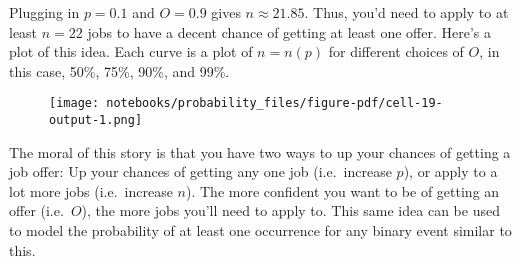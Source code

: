 \documentclass[
  letterpaper,
  DIV=11,
  numbers=noendperiod]{scrreprt}
\newenvironment{Shaded}{\begin{snugshade}}{\end{snugshade}}
\newcommand{\BuiltInTok}[1]{\textcolor[rgb]{0.00,0.23,0.31}{#1}}
\newcommand{\ControlFlowTok}[1]{\textcolor[rgb]{0.00,0.23,0.31}{#1}}
\newcommand{\DecValTok}[1]{\textcolor[rgb]{0.68,0.00,0.00}{#1}}
\newcommand{\FloatTok}[1]{\textcolor[rgb]{0.68,0.00,0.00}{#1}}
\newcommand{\KeywordTok}[1]{\textcolor[rgb]{0.00,0.23,0.31}{#1}}
\newcommand{\NormalTok}[1]{\textcolor[rgb]{0.00,0.23,0.31}{#1}}
\newcommand{\OperatorTok}[1]{\textcolor[rgb]{0.37,0.37,0.37}{#1}}
\newcommand{\SpecialCharTok}[1]{\textcolor[rgb]{0.37,0.37,0.37}{#1}}
\newcommand{\SpecialStringTok}[1]{\textcolor[rgb]{0.13,0.47,0.30}{#1}}
\newcommand{\StringTok}[1]{\textcolor[rgb]{0.13,0.47,0.30}{#1}}
\newcommand{\VariableTok}[1]{\textcolor[rgb]{0.07,0.07,0.07}{#1}}
\begin{document}
Plugging in \(p=0.1\) and \(O=0.9\) gives \(n \approx 21.85\). Thus,
you'd need to apply to at least \(n=22\) jobs to have a decent chance of
getting at least one offer. Here's a plot of this idea. Each curve is a
plot of \(n=n(p)\) for different choices of \(O\), in this case, 50\%,
75\%, 90\%, and 99\%.

\begin{Shaded}
\end{Shaded}

\begin{figure}[H]

{\centering \texttt{[image: notebooks/probability\_files/figure-pdf/cell-19-output-1.png]}

}

\end{figure}

The moral of this story is that you have two ways to up your chances of
getting a job offer: Up your chances of getting any one job
(i.e.~increase \(p\)), or apply to a lot more jobs (i.e.~increase
\(n\)). The more confident you want to be of getting an offer
(i.e.~\(O\)), the more jobs you'll need to apply to. This same idea can
be used to model the probability of at least one occurrence for any
binary event similar to this.
\end{document}
